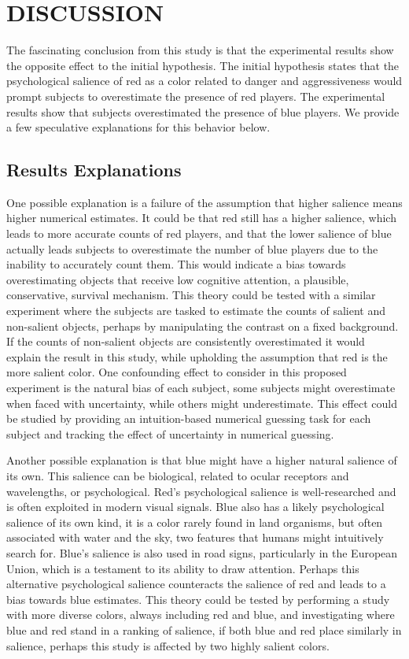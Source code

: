 \section{DISCUSSION}\label{s:discussion}

The fascinating conclusion from this study is that the experimental results show the opposite effect to the initial hypothesis. The initial hypothesis states that the psychological salience of red as a color related to danger and aggressiveness would prompt subjects to overestimate the presence of red players. The experimental results show that subjects overestimated the presence of blue players. We provide a few speculative explanations for this behavior below.

\subsection{Results Explanations}

One possible explanation is a failure of the assumption that higher salience means higher numerical estimates. It could be that red still has a higher salience, which leads to more accurate counts of red players, and that the lower salience of blue actually leads subjects to overestimate the number of blue players due to the inability to accurately count them. This would indicate a bias towards overestimating objects that receive low cognitive attention, a plausible, conservative, survival mechanism. This theory could be tested with a similar experiment where the subjects are tasked to estimate the counts of salient and non-salient objects, perhaps by manipulating the contrast on a fixed background. If the counts of non-salient objects are consistently overestimated it would explain the result in this study, while upholding the assumption that red is the more salient color. One confounding effect to consider in this proposed experiment is the natural bias of each subject, some subjects might overestimate when faced with uncertainty, while others might underestimate. This effect could be studied by providing an intuition-based numerical guessing task for each subject and tracking the effect of uncertainty in numerical guessing.

Another possible explanation is that blue might have a higher natural salience of its own. This salience can be biological, related to ocular receptors and wavelengths, or psychological. Red's psychological salience is well-researched and is often exploited in modern visual signals. Blue also has a likely psychological salience of its own kind, it is a color rarely found in land organisms, but often associated with water and the sky, two features that humans might intuitively search for. Blue's salience is also used in road signs, particularly in the European Union, which is a testament to its ability to draw attention. Perhaps this alternative psychological salience counteracts the salience of red and leads to a bias towards blue estimates. This theory could be tested by performing a study with more diverse colors, always including red and blue, and investigating where blue and red stand in a ranking of salience, if both blue and red place similarly in salience, perhaps this study is affected by two highly salient colors.

